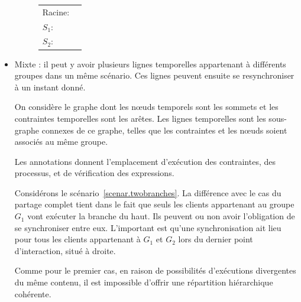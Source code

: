 \documentclass[10pt]{article}
\newcommand\trigger{point d'interaction\xspace}
\begin{document}
\begin{itemize}
    \begin{figure}[h]
        \centering
        \begin{tabular}{L{3.5em}R{0.3\textwidth}}
            Racine: & \begin{tikzpicture}
            
            \end{tikzpicture} \\
            $S_1$: & \begin{tikzpicture}[scale=0.4, every node/.style={scale=0.6}]
            
            \end{tikzpicture} \\
            $S_2$: & \begin{tikzpicture}[scale=0.6, every node/.style={scale=0.6}]
            
            \end{tikzpicture} \\
        \end{tabular}
        \label{scenar.hierarchy}
    \end{figure}
    
    \item Mixte : il peut y avoir plusieurs lignes temporelles appartenant à différents groupes dans un même scénario. 
    Ces lignes peuvent ensuite se resynchroniser à un instant donné. 
    
    On considère le graphe dont les nœuds temporels sont les sommets et les contraintes temporelles sont les arêtes.
    Les lignes temporelles sont les sous-graphe connexes de ce graphe, telles que les contraintes et les nœuds soient associés au même groupe.
    
    Les annotations donnent l'emplacement d'exécution des contraintes, des processus, et de vérification des expressions. 
    
    Considérons le scénario~\ref{scenar.twobranches}. 
    La différence avec le cas du partage complet tient dans le fait que seuls les clients appartenant au groupe $G_1$ vont exécuter la branche du haut.
    Ils peuvent ou non avoir l'obligation de se synchroniser entre eux. 
    L'important est qu'une synchronisation ait lieu pour tous les clients appartenant à $G_1$ et $G_2$ lors du dernier \trigger, situé à droite.
    
    Comme pour le premier cas, en raison de possibilités d'exécutions divergentes du même contenu, il est impossible d'offrir une répartition hiérarchique cohérente.
    

\end{itemize}
\end{document}
